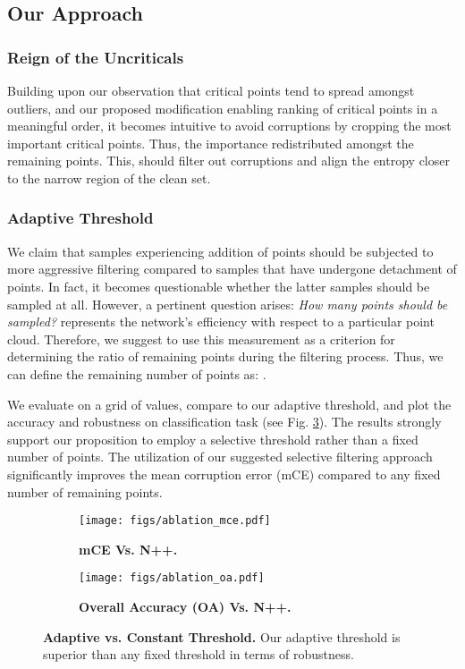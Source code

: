 \documentclass[10pt,twocolumn,letterpaper]{article}
\begin{document}
\subsection{Our Approach}
\subsubsection{Reign of the Uncriticals}
Building upon our observation that critical points tend to spread amongst outliers, and our proposed modification enabling ranking of critical points in a meaningful order, it becomes intuitive to avoid corruptions by cropping the most important critical points. Thus, the importance redistributed amongst the remaining points. This, should filter out corruptions and align the entropy closer to the narrow region of the clean set. 






\subsubsection{Adaptive Threshold}
We claim that samples experiencing addition of points should be subjected to more aggressive filtering compared to samples that have undergone detachment of points. In fact, it becomes questionable whether the latter samples should be sampled at all. However, a pertinent question arises: \textit{How many points should be sampled?} 
 represents the network's efficiency with respect to a particular point cloud. Therefore, we suggest to use this measurement as a criterion for determining the ratio of remaining points during the filtering process. Thus, we can define the remaining number of points as: .  

We evaluate on a grid of  values, compare to our adaptive threshold,
and plot the accuracy and robustness on classification task (see Fig. \ref{fig:adaptive_vs_fixed}). The results strongly support our proposition to employ a selective threshold rather than a fixed number of points. The utilization of our suggested selective filtering approach significantly improves the mean corruption error (mCE) compared to any fixed number of remaining points.
\begin{figure}[ptbh!]
    \centering
    \captionsetup[subfigure]{justification=centering}
    \begin{subfigure}[t]{0.48\linewidth} \texttt{[image: figs/ablation\_mce.pdf]}
\caption{{\bf  mCE Vs. N++.}}
        \label{subfig:ablation_mce}
    \end{subfigure}
    \begin{subfigure}[t]{0.48\linewidth} \texttt{[image: figs/ablation\_oa.pdf]}
\caption{{\bf Overall Accuracy (OA) Vs. N++.} }    
        \label{subfig:ablation_oa}
    \end{subfigure}
    \caption{{\bf Adaptive vs. Constant Threshold.} Our adaptive threshold is superior than any fixed threshold in terms of robustness.}
    \label{fig:adaptive_vs_fixed}
\end{figure}
\end{document}
